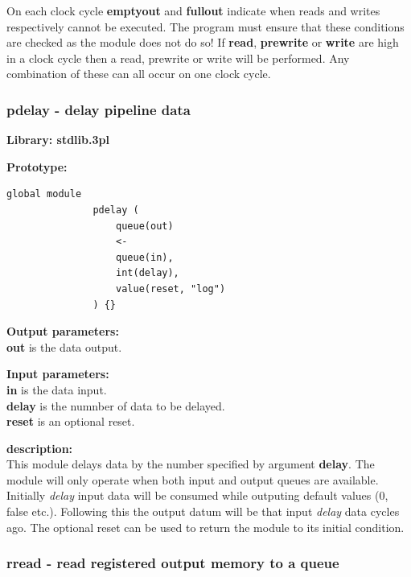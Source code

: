             On each clock cycle {\bf emptyout} and {\bf fullout} indicate
            when reads and writes respectively cannot be executed. The
            program must ensure that these conditions are checked as the
            module does not do so! If {\bf read}, {\bf prewrite} or {\bf
            write} are high in a clock cycle then a read, prewrite or write
            will be performed. Any combination of these can all occur on
            one clock cycle.


        \subsubsection{pdelay - delay pipeline data}\label{sec:lmpdelay}

            {\bf Library: stdlib.3pl}

            {\bf Prototype:} \\
            \vsp
            \begin{lstlisting}[gobble=12, language=threepl]
               global module
               pdelay (
                   queue(out)
                   <-
                   queue(in),
                   int(delay),
                   value(reset, "log")
               ) {}
            \end{lstlisting}

            {\bf Output parameters:} \\
            {\bf out} is the data output.

            {\bf Input parameters:} \\
            {\bf in} is the data input.\\
            {\bf delay} is the numnber of data to be delayed.\\
            {\bf reset} is an optional reset.

            {\bf description:} \\
            This module delays data by the number specified by argument
            {\bf delay}. The module will only operate when both input
            and output queues are available. Initially {\em delay} input data
            will be consumed while outputing default values (0, false etc.).
            Following this the output datum will be that input {\em delay}
            data cycles ago. The optional reset can be used to return the
            module to its initial condition.


        \subsubsection{rread - read registered output memory to a
                                                    queue}\label{sec:lmrread}

